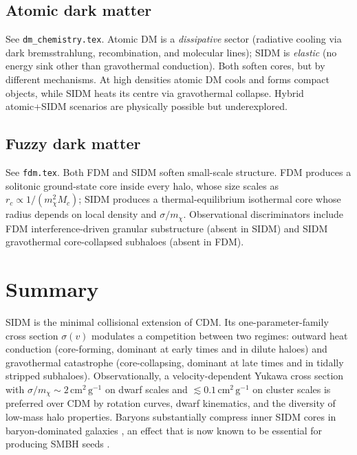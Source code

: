 \documentclass[12pt]{article}
\newcommand{\cmg}{\,\mathrm{cm^2\,g^{-1}}}
\newcommand{\smx}{\sigma/m_\chi}
\begin{document}
\subsection{Atomic dark matter}

See \texttt{dm\_chemistry.tex}.  Atomic DM is a \emph{dissipative}
sector (radiative cooling via dark bremsstrahlung, recombination, and
molecular lines); SIDM is \emph{elastic} (no energy sink other than
gravothermal conduction).  Both soften cores, but by different
mechanisms.  At high densities atomic DM cools and forms compact
objects, while SIDM heats its centre via gravothermal collapse.
Hybrid atomic+SIDM scenarios are physically possible but underexplored.

\subsection{Fuzzy dark matter}

See \texttt{fdm.tex}.  Both FDM and SIDM soften small-scale
structure.  FDM produces a solitonic ground-state core inside every
halo, whose size scales as $r_c\propto 1/(m_\chi^2 M_c)$; SIDM
produces a thermal-equilibrium isothermal core whose radius depends
on local density and $\smx$.  Observational discriminators include
FDM interference-driven granular substructure (absent in SIDM) and
SIDM gravothermal core-collapsed subhaloes (absent in FDM).

\section{Summary}
\label{sec:summary}

SIDM is the minimal collisional extension of CDM.  Its
one-parameter-family cross section $\sigma(v)$ modulates a competition
between two regimes: outward heat conduction (core-forming, dominant
at early times and in dilute haloes) and gravothermal catastrophe
(core-collapsing, dominant at late times and in tidally stripped
subhaloes).  Observationally, a velocity-dependent Yukawa cross
section with $\smx\sim 2\cmg$ on dwarf scales and $\lesssim 0.1\cmg$
on cluster scales is preferred over CDM by rotation curves, dwarf
kinematics, and the diversity of low-mass halo properties.  Baryons
substantially compress inner SIDM cores in baryon-dominated galaxies
\citep{Kaplinghat2014,Robles2017}, an effect that is now known to be
essential for producing SMBH seeds \citep{Feng2021}.
\end{document}
